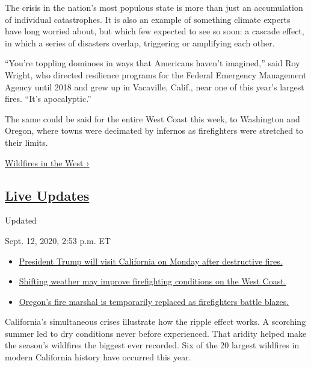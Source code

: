 The crisis in the nation's most populous state is more than just an
accumulation of individual catastrophes. It is also an example of
something climate experts have long worried about, but which few
expected to see so soon: a cascade effect, in which a series of
disasters overlap, triggering or amplifying each other.

``You're toppling dominoes in ways that Americans haven't imagined,''
said Roy Wright, who directed resilience programs for the Federal
Emergency Management Agency until 2018 and grew up in Vacaville, Calif.,
near one of this year's largest fires. ``It's apocalyptic.''

The same could be said for the entire West Coast this week, to
Washington and Oregon, where towns were decimated by infernos as
firefighters were stretched to their limits.

\href{https://www.nytimes3xbfgragh.onion/spotlight/california-wildfires}{Wildfires
in the West ›}

\hypertarget{live-updates}{%
\subsection{\texorpdfstring{\href{https://www.nytimes3xbfgragh.onion/2020/09/12/us/wildfires-live-updates.html}{Live
Updates}}{Live Updates}}\label{live-updates}}

Updated~

Sept. 12, 2020, 2:53 p.m. ET

\begin{itemize}
\tightlist
\item
  \href{https://www.nytimes3xbfgragh.onion/2020/09/12/us/wildfires-live-updates.html\#link-f3961ff}{President
  Trump will visit California on Monday after destructive fires.}
\item
  \href{https://www.nytimes3xbfgragh.onion/2020/09/12/us/wildfires-live-updates.html\#link-7e503ae9}{Shifting
  weather may improve firefighting conditions on the West Coast.}
\item
  \href{https://www.nytimes3xbfgragh.onion/2020/09/12/us/wildfires-live-updates.html\#link-5e4c548d}{Oregon's
  fire marshal is temporarily replaced as firefighters battle blazes.}
\end{itemize}

California's simultaneous crises illustrate how the ripple effect works.
A scorching summer led to dry conditions never before experienced. That
aridity helped make the season's wildfires the biggest ever recorded.
Six of the 20 largest wildfires in modern California history have
occurred this year.

